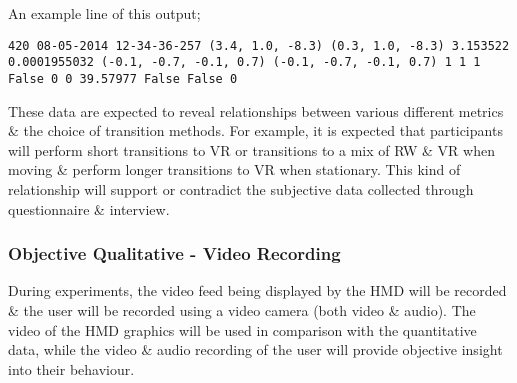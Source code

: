 \vspace{4mm}

An example line of this output;

\begin{center}
	\texttt{420	08-05-2014 12-34-36-257	(3.4, 1.0, -8.3)	(0.3, 1.0, -8.3)	3.153522	0.0001955032	(-0.1, -0.7, -0.1, 0.7)	(-0.1, -0.7, -0.1, 0.7)	1	1	1	False	0	0	39.57977	False	False	0}
\end{center}

These data are expected to reveal relationships between various different metrics \& the choice of transition methods. For example, it is expected that participants will perform short transitions to VR or transitions to a mix of RW \& VR when moving \& perform longer transitions to VR when stationary. This kind of relationship will support or contradict the subjective data collected through questionnaire \& interview.


\subsubsection{Objective Qualitative - Video Recording}
During experiments, the video feed being displayed by the HMD will be recorded \& the user will be recorded using a video camera (both video \& audio). The video of the HMD graphics will be used in comparison with the quantitative data, while the video \& audio recording of the user will provide objective insight into their behaviour.



